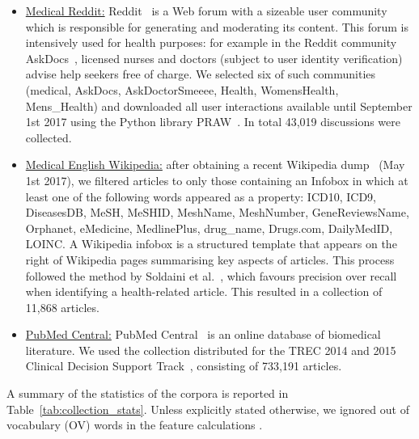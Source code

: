 \documentclass[10pt,a4paper]{article}
\begin{document}
\begin{itemize}[leftmargin=*]
	\item \underline{Medical Reddit:} Reddit~\cite{reddit} is a Web forum with a sizeable user community which is responsible for generating and moderating its content. This forum is intensively used for health purposes: for example in the Reddit community AskDocs~\cite{redditaskdocs}, licensed nurses and doctors (subject to user identity verification) advise help seekers free of charge. We selected six of such communities (medical, AskDocs, AskDoctorSmeeee, Health, WomensHealth, Mens\_Health) and downloaded all user interactions available until September 1st 2017 using the Python library PRAW~\cite{redditapi}. In total 43,019 discussions were collected.
	
	\item \underline{Medical English Wikipedia:} after obtaining a recent Wikipedia dump~\cite{wikipedia} (May 1st 2017), we filtered articles to only those containing an Infobox in which at least one of the following words appeared as a property: ICD10, ICD9, DiseasesDB, MeSH, MeSHID, MeshName, MeshNumber, GeneReviewsName, Orphanet, eMedicine, MedlinePlus, drug\_name, Drugs.com, DailyMedID, LOINC. A Wikipedia infobox is a structured template that appears on the right of Wikipedia pages summarising key aspects of articles. 
	This process followed the method by Soldaini et al.~\cite{soldaini15}, which favours precision over recall when identifying a health-related article. This resulted in a collection of 11,868 articles. 
	
	\item \underline{PubMed Central:} PubMed Central~\cite{pubmed} is an online  database of biomedical literature. We used the collection distributed for the TREC 2014 and 2015 Clinical Decision Support Track~\cite{roberts16,trec15}, consisting of 733,191 articles. 
	
\end{itemize}

A summary of the statistics of the corpora is reported in Table~\ref{tab:collection_stats}. 
Unless explicitly stated otherwise, we ignored out of vocabulary (OV) words in the feature calculations  .
\end{document}
